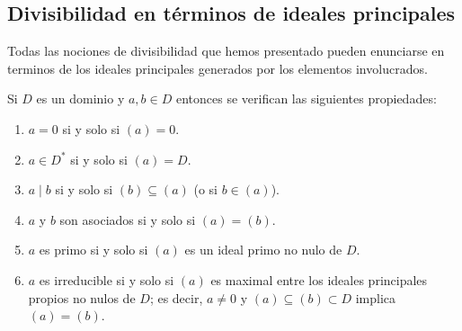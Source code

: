 \clearpage
\subsection{Divisibilidad en términos de ideales principales}

Todas las nociones de divisibilidad que hemos presentado pueden enunciarse en terminos de los ideales principales generados por los elementos involucrados.

\begin{proposition}{}{}
Si \(D\) es un dominio y \(a, b \in D\) entonces se verifican las siguientes propiedades:

\begin{enumerate}
\item \(a = 0\) si y solo si \((a) = 0\).

\item \(a \in D^*\) si y solo si \((a) = D\).

\item \(a \mid b\) si y solo si \((b) \subseteq (a)\) (o si \(b \in (a)\)).

\item \(a\) y \(b\) son asociados si y solo si \((a) = (b)\).

\item \(a\) es primo si y solo si \((a)\) es un ideal primo no nulo de \(D\).

\item \(a\) es irreducible si y solo si \((a)\) es maximal entre los ideales principales propios no nulos de \(D\); es decir, \(a \neq 0\) y \((a) \subseteq (b) \subset D\) implica \((a) = (b)\).
\end{enumerate}

\end{proposition}

